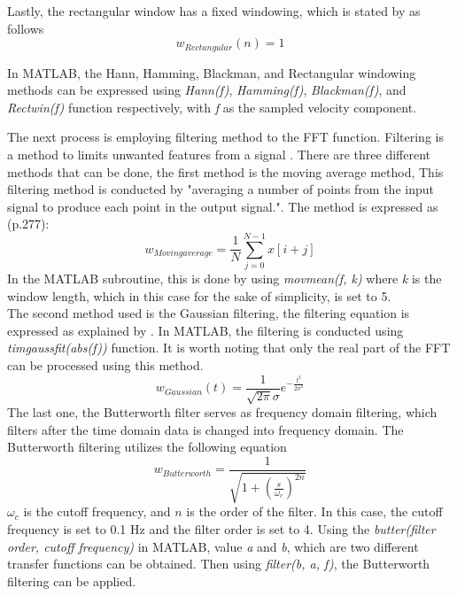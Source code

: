\documentclass[11pt]{article}
\begin{document}
\noindent Lastly, the rectangular window has a fixed windowing, which is stated by \citet{Rose2011} as follows
\begin{equation}
    w_{Rectangular}(n) = 1
\end{equation}

\noindent In MATLAB, the Hann, Hamming, Blackman, and Rectangular windowing methods can be expressed using \textit{Hann(f)}, \textit{Hamming(f)}, \textit{Blackman(f)}, and \textit{Rectwin(f)} function respectively, with \textit{f} as the sampled velocity component.
\newline

\noindent The next process is employing filtering method to the FFT function. Filtering is a method to limits unwanted features from a signal \citep{VRU2023b}. There are three different methods that can be done, the first method is the moving average method, This filtering method is conducted by "averaging a number of points from the input signal to produce each point in the output signal."\citep[p.277]{Smith1998}. The method is expressed as (p.277):
\begin{equation}
    w_{Moving average} = \frac1N \sum_{j=0}^{N-1}x[i+j]
\end{equation}
In the MATLAB subroutine, this is done by using \textit{movmean(f, k)} where \textit{k} is the window length, which in this case for the sake of simplicity, is set to 5.\\
\newline
\noindent The second method used is the Gaussian filtering, the filtering equation is expressed as explained by \citet{Fatahalian2023}. In MATLAB, the filtering is conducted using \textit{timgaussfit(abs(f))} function. It is worth noting that only the real part of the FFT can be processed using this method.
\begin{equation}
    w_{Gaussian}(t) = \frac{1}{\sqrt{2\pi}\sigma}e^{-\frac{t^2}{2\sigma^2}}
\end{equation}
\newline
The last one, the Butterworth filter serves as frequency domain filtering, which filters after the time domain data is changed into frequency domain. The Butterworth filtering utilizes the following equation \citep{Butterworth1930}
\begin{equation}
    w_{Butterworth} = \frac{1}{\sqrt{1+ \left(\frac{s}{\omega_c}\right)^{2n}}}
\end{equation}
$\omega_c$ is the cutoff frequency, and $n$ is the order of the filter. In this case, the cutoff frequency is set to 0.1 Hz and the filter order is set to 4. Using the \textit{butter(filter order, cutoff frequency)} in MATLAB, value \textit{a} and \textit{b}, which are two different transfer functions can be obtained. Then using \textit{filter(b, a, f)}, the Butterworth filtering can be applied.
\end{document}
